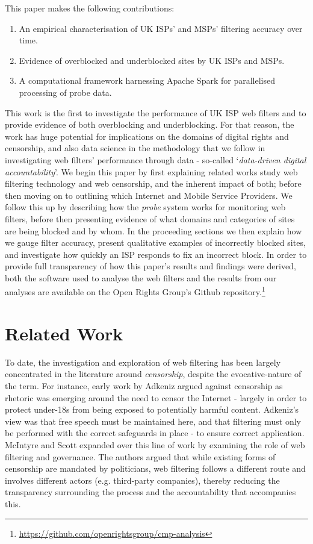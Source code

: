 \documentclass{bmcart}
\begin{document}
This paper makes the following contributions:
\begin{enumerate}
	\item An empirical characterisation of UK ISPs' and MSPs' filtering accuracy over time.
	\item Evidence of overblocked and underblocked sites by UK ISPs and MSPs.
	\item A computational framework harnessing Apache Spark for parallelised processing of probe data.
\end{enumerate}

This work is the first to investigate the performance of UK ISP web filters and to provide evidence of both overblocking and underblocking.
For that reason, the work has huge potential for implications on the domains of digital rights and censorship, and also data science in the methodology that we follow in investigating web filters' performance through data - so-called `\textit{data-driven digital accountability}'. 
We begin this paper by first explaining related works study web filtering technology and web censorship, and the inherent impact of both; before then moving on to outlining which Internet and Mobile Service Providers.
We follow this up by describing how the \textit{probe} system works for monitoring web filters, before then presenting evidence of what domains and categories of sites are being blocked and by whom.
In the proceeding sections we then explain how we gauge filter accuracy, present qualitative examples of incorrectly blocked sites, and investigate how quickly an ISP responds to fix an incorrect block.
In order to provide full transparency of how this paper's results and findings were derived, both the software used to analyse the web filters and the results from our analyses are available on the Open Rights Group's Github repository.\footnote{\url{https://github.com/openrightsgroup/cmp-analysis}}





\section*{Related Work}
To date, the investigation and exploration of web filtering has been largely concentrated in the literature around \textit{censorship}, despite the evocative-nature of the term.
For instance, early work by Adkeniz \cite{akdeniz2001internet} argued against censorship as rhetoric was emerging around the need to censor the Internet - largely in order to protect under-18s from being exposed to potentially harmful content.
Adkeniz's view was that free speech must be maintained here, and that filtering must only be performed with the correct safeguards in place - to ensure correct application.
McIntyre and Scott \cite{mcintyre2008internet} expanded over this line of work by examining the role of web filtering and governance.
The authors argued that while existing forms of censorship are mandated by politicians, web filtering follows a different route and involves different actors (e.g. third-party companies), thereby reducing the transparency surrounding the process and the accountability that accompanies this.
\end{document}
